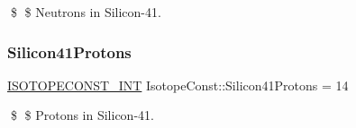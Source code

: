 \$ \$ Neutrons in Silicon-\/41. \mbox{\label{group___isotope_const-_silicon-_si41_gade352697f75e51c8f4f17a59abbbb9ae}} 
\subsubsection{\texorpdfstring{Silicon41\+Protons}{Silicon41Protons}}
{\footnotesize\ttfamily \mbox{\hyperlink{group___isotope_const-_macros_ga5f18360b3e99483a35c32d789e62621c}{I\+S\+O\+T\+O\+P\+E\+C\+O\+N\+S\+T\+\_\+\+I\+NT}} Isotope\+Const\+::\+Silicon41\+Protons = 14}

\$ \$ Protons in Silicon-\/41. 